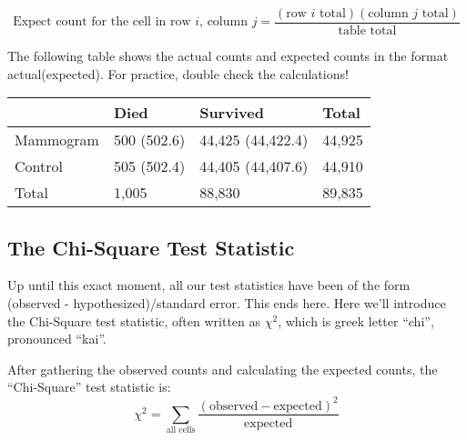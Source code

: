 \documentclass[
  letterpaper,
  DIV=11,
  numbers=noendperiod]{scrreprt}
\begin{document}
\begin{tcolorbox}[enhanced jigsaw, toptitle=1mm, colbacktitle=quarto-callout-note-color!10!white, breakable, leftrule=.75mm, left=2mm, opacityback=0, colframe=quarto-callout-note-color-frame, rightrule=.15mm, toprule=.15mm, bottomtitle=1mm, titlerule=0mm, title=\textcolor{quarto-callout-note-color}{\faInfo}\hspace{0.5em}{Expected Counts for a Two-Way Table}, arc=.35mm, colback=white, bottomrule=.15mm, opacitybacktitle=0.6, coltitle=black]

\[
\text{Expect count for the cell in row }i\text{, column }j = \frac{(\text{row }i\text{ total})(\text{column }j\text{ total})}{\text{table total}}
\]

\end{tcolorbox}

The following table shows the actual counts and expected counts in the
format actual(expected). For practice, double check the calculations!

\begin{longtable}[]{@{}llll@{}}
\toprule\noalign{}
& Died & Survived & Total \\
\midrule\noalign{}
\endhead
\bottomrule\noalign{}
\endlastfoot
Mammogram & 500 (502.6) & 44,425 (44,422.4) & 44,925 \\
Control & 505 (502.4) & 44,405 (44,407.6) & 44,910 \\
Total & 1,005 & 88,830 & 89,835 \\
\end{longtable}

\hypertarget{the-chi-square-test-statistic}{%
\subsection{The Chi-Square Test
Statistic}\label{the-chi-square-test-statistic}}

Up until this exact moment, all our test statistics have been of the
form (observed - hypothesized)/standard error. This ends here. Here
we'll introduce the Chi-Square test statistic, often written as
\(\chi^2\), which is greek letter ``chi'', pronounced ``kai''.

\begin{tcolorbox}[enhanced jigsaw, toptitle=1mm, colbacktitle=quarto-callout-note-color!10!white, breakable, leftrule=.75mm, left=2mm, opacityback=0, colframe=quarto-callout-note-color-frame, rightrule=.15mm, toprule=.15mm, bottomtitle=1mm, titlerule=0mm, title=\textcolor{quarto-callout-note-color}{\faInfo}\hspace{0.5em}{The \(\chi^2\) Test Statistic}, arc=.35mm, colback=white, bottomrule=.15mm, opacitybacktitle=0.6, coltitle=black]

After gathering the observed counts and calculating the expected counts,
the ``Chi-Square'' test statistic is: \[
\chi^2 = \sum_{\text{all cells}}\frac{(\text{observed} - \text{expected})^2}{\text{expected}}
\]

\end{tcolorbox}
\end{document}
